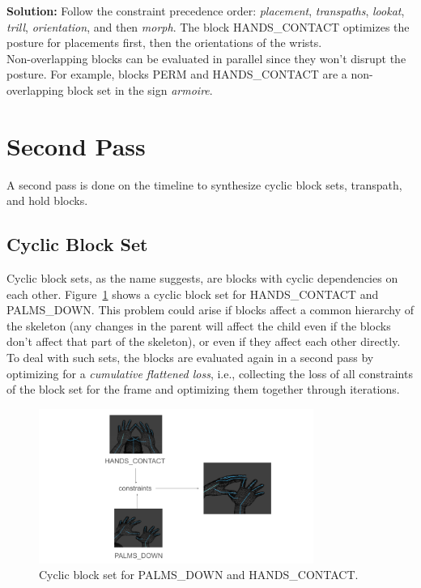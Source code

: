 \documentclass[../../main.tex]{subfiles}
\begin{document}
\textbf{Solution:} Follow the constraint precedence order: \emph{placement}, \emph{transpaths}, \emph{lookat}, \emph{trill}, \emph{orientation}, and then \emph{morph}. The block HANDS\_CONTACT optimizes the posture for placements first, then the orientations of the wrists. \\

Non-overlapping blocks can be evaluated in parallel since they won't disrupt the posture. For example, blocks PERM and HANDS\_CONTACT are a non-overlapping block set in the sign \emph{armoire}.

\section{Second Pass}
\label{ch:multi_track:second_pass}

A second pass is done on the timeline to synthesize cyclic block sets, transpath, and hold blocks.

\subsection{Cyclic Block Set}
\label{ch:multi_track:second_pass:cyclic_blocks}

Cyclic block sets, as the name suggests, are blocks with cyclic dependencies on each other. Figure~\ref{fig:cyclic_blocks} shows a cyclic block set for HANDS\_CONTACT and PALMS\_DOWN. This problem could arise if blocks affect a common hierarchy of the skeleton (any changes in the parent will affect the child even if the blocks don't affect that part of the skeleton), or even if they affect each other directly. To deal with such sets, the blocks are evaluated again in a second pass by optimizing for a \emph{cumulative flattened loss}, i.e., collecting the loss of all constraints of the block set for the frame and optimizing them together through iterations.

\begin{figure}[h]
    \centering
    \includegraphics[width=0.8\textwidth]{chapters/multi_track/images/cyclic_blocks.png}
    \caption{Cyclic block set for PALMS\_DOWN and HANDS\_CONTACT.}
    \label{fig:cyclic_blocks}
\end{figure}
\end{document}
